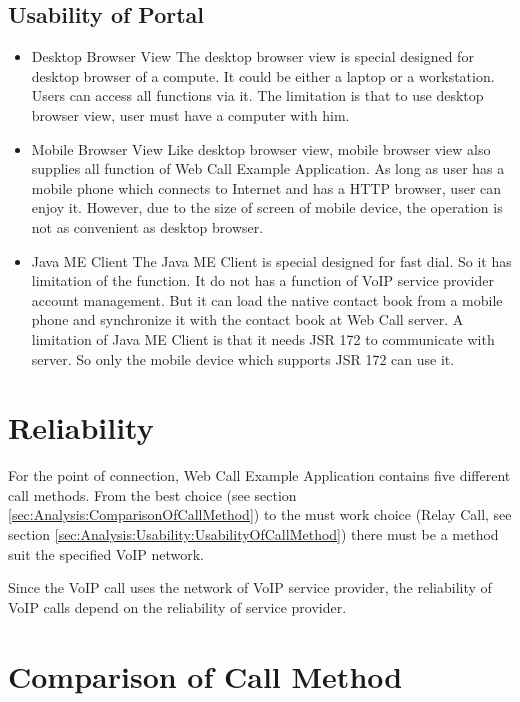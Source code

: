 \subsection{Usability of Portal}

\begin{itemize}

\item \textsf{Desktop Browser View} The desktop browser view is special designed for desktop browser of a compute. It could be either a laptop or a workstation. Users can access all functions via it. The limitation is that to use desktop browser view, user must have a computer with him.

\item \textsf{Mobile Browser View} Like desktop browser view, mobile browser view also supplies all function of \textsf{Web Call Example Application}. As long as user has a mobile phone which connects to Internet and has a HTTP browser, user can enjoy it. However, due to the size of screen of mobile device, the operation is not as convenient as desktop browser.

\item \textsf{Java ME Client} The Java ME Client is special designed for fast dial. So it has limitation of the function. It do not has a function of VoIP service provider account management. But it can load the native contact book from a mobile phone and synchronize it with the contact book at Web Call server. A limitation of Java ME Client is that it needs JSR 172 \cite{JSR172} to communicate with server. So only the mobile device which supports JSR 172 can use it.

\end{itemize}

\section{Reliability}

For the point of connection, \textsf{Web Call Example Application} contains five different call methods. From the best choice (see section \ref{sec:Analysis:ComparisonOfCallMethod}) to the must work choice (Relay Call, see section \ref{sec:Analysis:Usability:UsabilityOfCallMethod}) there must be a method suit the specified VoIP network. 

Since the VoIP call uses the network of VoIP service provider, the reliability of VoIP calls depend on the reliability of service provider. 

\section{Comparison of Call Method}

